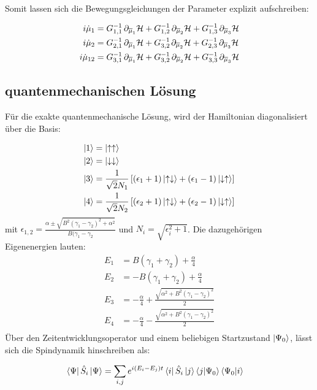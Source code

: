 \documentclass[12pt]{article}
\def\muk{\overline{\mu}}
\begin{document}
Somit lassen sich die Bewegungsgleichungen der Parameter explizit aufschreiben:

\begin{align}
    i\dot{\mu}_1 &= G_{1,1}^{-1}\thinspace \partial_{\muk_1}\mathcal{H} + G_{1,2}^{-1}\thinspace\partial_{\muk_2}\mathcal{H} + G_{1,3}^{-1}\thinspace\partial_{\muk_3}\mathcal{H} \\
    i\dot{\mu}_2 &= G_{2,1}^{-1}\thinspace\partial_{\muk_1}\mathcal{H} + G_{3,2}^{-1\thinspace}\partial_{\muk_2}\mathcal{H} + G_{2,3}^{-1}\thinspace\partial_{\muk_3}\mathcal{H} \\
    i\dot{\mu}_{12} &= G_{3,1}^{-1}\thinspace\partial_{\muk_1}\mathcal{H} + G_{3,2}^{-1}\thinspace\partial_{\muk_2}\mathcal{H} + G_{3,3}^{-1}\thinspace\partial_{\muk_3}\mathcal{H} 
\end{align}



\subsection{quantenmechanischen Lösung}
Für die exakte quantenmechanische Lösung, wird der Hamiltonian diagonalisiert über die Basis:

\begin{align}
    \ket{1} &= \ket{\uparrow\uparrow}   \\
    \ket{2} &= \ket{\downarrow\downarrow} \\
    \ket{3} &= \frac{1}{\sqrt{2}N_1}\left[(\epsilon_1+1)\ket{\uparrow\downarrow} +(\epsilon_1-1)\ket{\downarrow\uparrow} \right]\\
    \ket{4} &= \frac{1}{\sqrt{2}N_2}\left[(\epsilon_2+1)\ket{\uparrow\downarrow} +(\epsilon_2-1)\ket{\downarrow\uparrow} \right]
\end{align}
mit $\epsilon_{1,2} = \frac{\alpha \pm \sqrt{B^2(\gamma_1-\gamma_2)^2+\alpha^2} }{B(\gamma_1-\gamma_2} $ und $N_{i} = \sqrt{\epsilon_i^2 + 1}$. Die dazugehörigen Eigenenergien lauten:
\begin{align}
    E_1 &= B(\gamma_1+\gamma_2) + \frac{\alpha}{4}\\
    E_2 &= -B(\gamma_1+\gamma_2) + \frac{\alpha}{4}\\
    E_3 &= -\frac{\alpha}{4} + \frac{\sqrt{\alpha^2 + B^2(\gamma_1-\gamma_2)^2}}{2}\\
    E_4 &= -\frac{\alpha}{4} - \frac{\sqrt{\alpha^2 + B^2(\gamma_1-\gamma_2)^2}}{2}\\
\end{align}
\noindent Über den Zeitentwicklungsoperator und einem beliebigen Startzustand $\ket{\Psi_0}$, lässt sich die Spindynamik hinschreiben als:

\begin{align}
    \bra{\Psi}\hat{S}_i\ket{\Psi} &= \sum_{i,j}e^{i(E_i-E_j)t}\bra{i}\hat{S}_i\ket{j}\bra{j}\ket{\Psi_0}\bra{\Psi_0}\ket{i}
\end{align}
    
\end{document}

